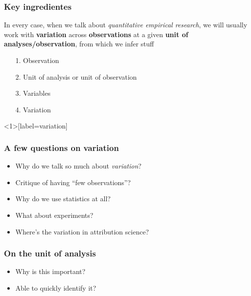 \documentclass[aspectratio=43]{beamer}
\begin{document}
\begin{frame}
\frametitle{Key ingredientes}
\centering

\begin{flushleft}
In every case, when we talk about \textit{quantitative empirical research}, we will usually work with \textbf{variation} across \textbf{observations} at a given \textbf{unit of analyses/observation}, from which we infer stuff
\end{flushleft}


\vspace{10pt}

\begin{itemize}[<+->]
  \item[1.] Observation
  \item[2.] Unit of analysis or unit of observation
  \item[3.] Variables
  \item[4.] Variation
\end{itemize}

\end{frame}

\begin{frame}<1>[label=variation]
\frametitle{A few questions on variation}
\centering

\begin{itemize}
  \item Why do we talk so much about \textit{variation}?
  \item<2-> Critique of having ``few observations''?
  \item<3-> Why do we use statistics at all?
  \item<4-> What about experiments?
  \item<5-> Where's the variation in attribution science?
\end{itemize}

\end{frame}



\begin{frame}
\frametitle{On the unit of analysis}
\centering

\begin{itemize}
  \item Why is this important?
  \item<2-> Able to quickly identify it?
\end{itemize}

\end{frame}
  
\end{document}
